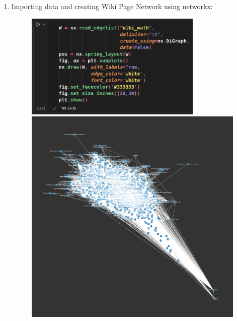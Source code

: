 \documentclass{article}
\begin{document}
    \begin{enumerate}[label=(\alph*), left=10pt, itemsep=10pt]
        
        \item \begin{minipage}[t]{0.9\textwidth}
            Importing data and creating Wiki Page Network using networkx:
            \begin{figure}[H]
                \centering
                \includegraphics[width=0.8\textwidth, height=0.3\textheight]{./3a.png}
                \includegraphics[width=1\textwidth, height=0.4\textheight]{./3ai.png}
            \end{figure}
        \end{minipage}


\end{enumerate}
\end{document}
